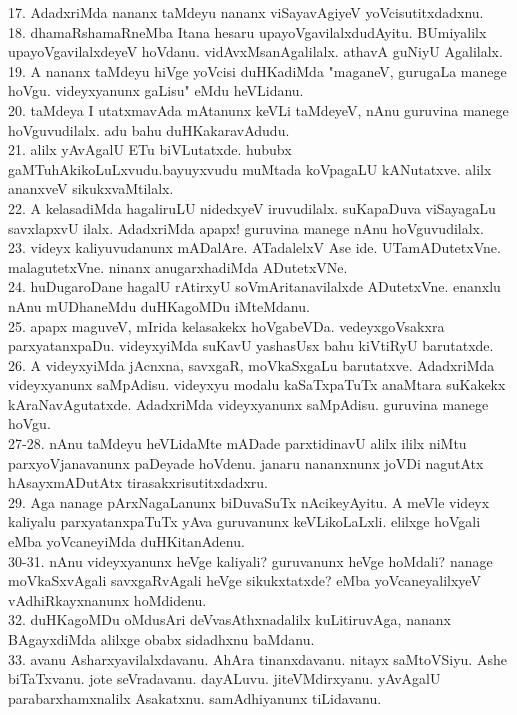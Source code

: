 \documentclass{article}
\begin{document}
17. AdadxriMda nananx taMdeyu nananx viSayavAgiyeV yoVcisutitxdadxnu.\\
18. dhamaRshamaRneMba Itana hesaru upayoVgavilalxdudAyitu. BUmiyalilx upayoVgavilalxdeyeV hoVdanu. vidAvxMsanAgalilalx. athavA guNiyU Agalilalx.\\
19. A nananx taMdeyu hiVge yoVcisi duHKadiMda "maganeV, gurugaLa manege hoVgu. videyxyanunx gaLisu" eMdu heVLidanu.\\
20. taMdeya I utatxmavAda mAtanunx keVLi taMdeyeV, nAnu guruvina manege hoVguvudilalx. adu bahu duHKakaravAdudu.\\
21. alilx yAvAgalU ETu biVLutatxde. hububx gaMTuhAkikoLuLxvudu.bayuyxvudu muMtada koVpagaLU kANutatxve. alilx ananxveV sikukxvaMtilalx.\\
22. A kelasadiMda hagaliruLU nidedxyeV iruvudilalx. suKapaDuva viSayagaLu savxlapxvU ilalx. AdadxriMda apapx! guruvina manege nAnu hoVguvudilalx.\\
23. videyx kaliyuvudanunx mADalAre. ATadalelxV Ase ide. UTamADutetxVne. malagutetxVne. ninanx anugarxhadiMda ADutetxVNe.\\
24. huDugaroDane hagalU rAtirxyU soVmAritanavilalxde ADutetxVne. enanxlu nAnu mUDhaneMdu duHKagoMDu iMteMdanu.\\
25. apapx maguveV, mIrida kelasakekx hoVgabeVDa. vedeyxgoVsakxra parxyatanxpaDu. videyxyiMda suKavU yashasUsx bahu kiVtiRyU barutatxde.\\
26. A videyxyiMda jAcnxna, savxgaR, moVkaSxgaLu barutatxve. AdadxriMda videyxyanunx saMpAdisu. videyxyu modalu kaSaTxpaTuTx anaMtara suKakekx kAraNavAgutatxde. AdadxriMda videyxyanunx saMpAdisu. guruvina manege hoVgu.\\
27-28. nAnu taMdeyu heVLidaMte mADade parxtidinavU alilx ililx niMtu parxyoVjanavanunx paDeyade hoVdenu. janaru nananxnunx joVDi nagutAtx hAsayxmADutAtx tirasakxrisutitxdadxru.\\
29. Aga nanage pArxNagaLanunx biDuvaSuTx nAcikeyAyitu. A meVle videyx kaliyalu parxyatanxpaTuTx yAva guruvanunx keVLikoLaLxli. elilxge hoVgali eMba yoVcaneyiMda duHKitanAdenu.\\
30-31. nAnu videyxyanunx heVge kaliyali? guruvanunx heVge hoMdali? nanage moVkaSxvAgali savxgaRvAgali heVge sikukxtatxde? eMba yoVcaneyalilxyeV vAdhiRkayxnanunx hoMdidenu.\\
32. duHKagoMDu oMdusAri deVvasAthxnadalilx kuLitiruvAga, nananx BAgayxdiMda alilxge obabx sidadhxnu baMdanu.\\
33. avanu Asharxyavilalxdavanu. AhAra tinanxdavanu. nitayx saMtoVSiyu. Ashe biTaTxvanu. jote seVradavanu. dayALuvu. jiteVMdirxyanu. yAvAgalU parabarxhamxnalilx Asakatxnu. samAdhiyanunx tiLidavanu.\\
\end{document}
